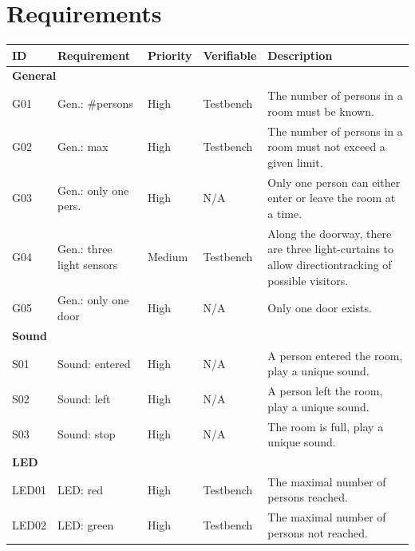 \documentclass[12pt,a4 paper] {report}
\begin{document}
\chapter{Requirements}
\begin{center}
	\begin{tabular}{|p{1.5cm}|p{3.5cm}|p{1.5cm}|p{2cm}|p{5.5cm}|}
		\hline
		\textbf{ID} & \textbf{Requirement} & \textbf{Priority} & \textbf{Verifiable} & \textbf{Description} \\
		\hline
		\multicolumn{5}{|l|}{\textbf{General}} \\
		\hline
		G01 & Gen.: \#persons &  High &  Testbench & The number of persons in a room must be known. \\
		\hline
		G02 & Gen.: max & High &  Testbench & The number of persons in a room must not exceed a given limit. \\
		\hline
		G03 & Gen.: only one pers. & High & N/A & Only one person can either enter or leave the room at a time. \\
		\hline
		G04 & Gen.: three light sensors & Medium & Testbench & Along the doorway, there are three light-curtains to allow directiontracking of possible visitors. \\
		\hline
		G05 & Gen.: only one door & High & N/A & Only one door exists. \\
		\hline
		\multicolumn{5}{|l|}{\textbf{Sound}} \\
		\hline
		S01 & Sound: entered & High & N/A & A person entered the room, play a unique sound. \\
		\hline
		S02 & Sound: left & High & N/A & A person left the room, play a unique sound. \\
		\hline
		S03 & Sound: stop & High & N/A & The room is full, play a unique sound. \\
		\hline
		\multicolumn{5}{|l|}{\textbf{LED}} \\
		\hline
		LED01 & LED: red &  High & Testbench & The maximal number of persons reached. \\
		\hline
		LED02 & LED: green & High & Testbench & The maximal number of persons not reached. \\
		\hline
	\end{tabular}
\end{center}
\end{document}
